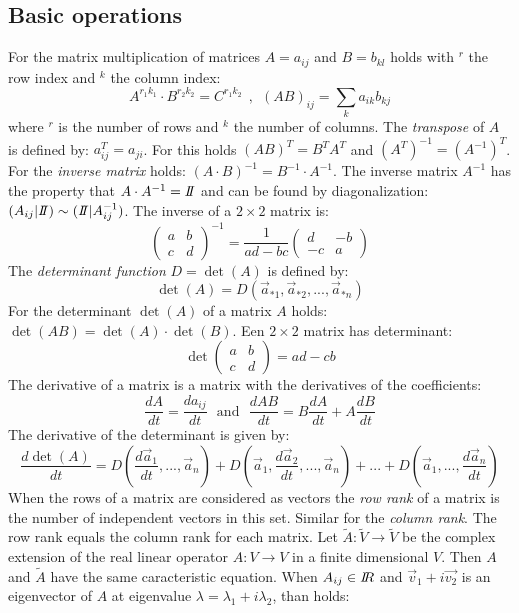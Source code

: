 \documentclass[a4paper,fancyheadings,twoside]{report}
\begin{document}
\subsection{Basic operations}
For the matrix multiplication of matrices $A=a_{ij}$ and $B=b_{kl}$ holds
with $^r$ the row index and $^k$ the column index:
\[
A^{r_1k_1}\cdot B^{r_2k_2}=C^{r_1k_2}~~,~~(AB)_{ij}=\sum_ka_{ik}b_{kj}
\]
where $^r$ is the number of rows and $^k$ the number of columns.
\npar
The {\it transpose} of $A$ is defined by: $a_{ij}^T=a_{ji}$.
For this holds $(AB)^T=B^TA^T$ and $(A^T)^{-1}=(A^{-1})^T$. For the
{\it inverse matrix} holds: $(A\cdot B)^{-1}=B^{-1}\cdot A^{-1}$. The inverse
matrix $A^{-1}$ has the property that $A\cdot A^{-1}=I\hspace{-1mm}I$ and can be found by
diagonalization: $(A_{ij}|I\hspace{-1mm}I)\sim(I\hspace{-1mm}I|A_{ij}^{-1})$.
\npar
The inverse of a $2\times2$ matrix is:
\[
\left(\begin{array}{cc}a&b\\ c&d\end{array}\right)^{-1}=\frac{1}{ad-bc}
\left(\begin{array}{cc}d&-b\\ -c&a\end{array}\right)
\]
\npar
The {\it determinant function} $D=\det(A)$ is defined by:
\[
\det(A)=D(\vec{a}_{*1},\vec{a}_{*2},...,\vec{a}_{*n})
\]
For the determinant $\det(A)$ of a matrix $A$ holds:
$\det(AB)=\det(A)\cdot\det(B)$. Een $2\times2$ matrix has determinant:
\[
\det\left(\begin{array}{cc}a&b\\ c&d \end{array}\right)=ad-cb
\]
The derivative of a matrix is a matrix with the derivatives of the coefficients:
\[
\frac{dA}{dt}=\frac{da_{ij}}{dt}~~~\mbox{and}~~~\frac{dAB}{dt}=B\frac{dA}{dt}+A\frac{dB}{dt}
\]
The derivative of the determinant is given by:
\[
\frac{d\det(A)}{dt}=D(\frac{d\vec{a}_1}{dt},...,\vec{a}_n)+
D(\vec{a}_1,\frac{d\vec{a}_2}{dt},...,\vec{a}_n)+...+D(\vec{a}_1,...,\frac{d\vec{a}_n}{dt})
\]
When the rows of a matrix are considered as vectors the {\it row rank} of a
matrix is the number of independent vectors in this set. Similar for the
{\it column rank}. The row rank equals the column rank for each matrix.
\npar
Let $\tilde{A}:\tilde{V}\rightarrow\tilde{V}$ be the complex extension of the
real linear operator $A:V\rightarrow V$ in a finite dimensional $V$.
Then $A$ and $\tilde{A}$ have the same caracteristic equation.
\npar
When $A_{ij}\in I\hspace{-1mm}R$ and $\vec{v}_1+i\vec{v_2}$ is an eigenvector of $A$
at eigenvalue $\lambda=\lambda_1+i\lambda_2$, than holds:
\end{document}

